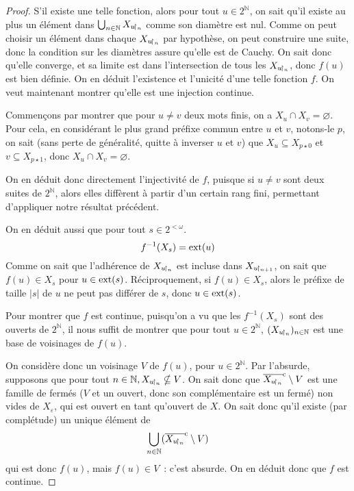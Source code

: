 \begin{proof}
  S'il existe une telle fonction, alors pour tout $u \in 2^{\mathbb N}$, on
  sait qu'il existe au plus un élément dans
  $\bigcup_{n \in \mathbb N} X_{u\!\upharpoonright_{n}}$ comme son diamètre est nul. Comme on
  peut choisir un élément dans chaque $X_{u\!\upharpoonright_{n}}$ par hypothèse, on peut
  construire une suite, donc la condition sur les diamètres assure qu'elle est
  de Cauchy. On sait donc qu'elle converge, et sa limite est dans l'intersection
  de tous les $X_{u\!\upharpoonright_{n}}$, donc $f(u)$ est bien définie. On en déduit
  l'existence et l'unicité d'une telle fonction $f$. On veut maintenant montrer
  qu'elle est une injection continue.
  
  Commençons par montrer que pour $u \neq v$ deux mots finis, on a
  $X_u \cap X_v = \varnothing$. Pour cela, en considérant le plus grand préfixe
  commun entre $u$ et $v$, notons-le $p$, on sait (sans perte de généralité,
  quitte à inverser $u$ et $v$) que $X_u \subseteq X_{p\star 0}$ et
  $v \subseteq X_{p\star 1}$, donc $X_u\cap X_v =\varnothing$.

  On en déduit donc directement l'injectivité de $f$, puisque si $u \neq v$
  sont deux suites de $2^\mathbb N$, alors elles diffèrent à partir d'un certain
  rang fini, permettant d'appliquer notre résultat précédent.

  On en déduit aussi que pour tout $s \in 2^{<\omega}$.
  \[f^{-1}(X_s) = \operatorname{ext}(u)\]
  Comme on sait que l'adhérence de $X_{u\!\upharpoonright_{n}}$ est incluse dans
  $X_{u \!\upharpoonright_{n + 1}}$, on sait que $f(u) \in X_s$ pour $u \in \operatorname{ext}(s)$.
  Réciproquement, si $f(u) \in X_s$, alors le préfixe de taille $|s|$ de $u$
  ne peut pas différer de $s$, donc $u \in \operatorname{ext}(s)$.

  Pour montrer que $f$ est continue, puisqu'on a vu que les $f^{-1}(X_s)$ sont
  des ouverts de $2^\mathbb N$, il nous suffit de montrer que pour tout
  $u \in 2^\mathbb N$, $(X_{u\!\upharpoonright_{n}})_{n \in \mathbb N}$ est une base de voisinages
  de $f(u)$.

  On considère donc un voisinage $V$ de $f(u)$, pour $u \in 2^\mathbb N$. Par
  l'absurde, supposons que pour tout $n \in\mathbb N, X_{u\!\upharpoonright_{n}} \nsubseteq V$.
  On sait donc que $\overline{X_{u\!\upharpoonright_{n}}}^{\mathrm c} \setminus V$ est une famille de
  fermés ($V$ et un ouvert, donc son complémentaire est un fermé) non vides
  de $X_{\varepsilon}$, qui est ouvert en tant qu'ouvert de $X$. On sait donc
  qu'il existe (par complétude) un unique élément de
  \[\bigcup_{n \in \mathbb N} (\overline{X_{u\!\upharpoonright_{n}}}^{\mathrm c}\setminus V)\]
  qui est donc $f(u)$, mais $f(u) \in V$~: c'est absurde. On en déduit donc que
  $f$ est continue.
\end{proof}

